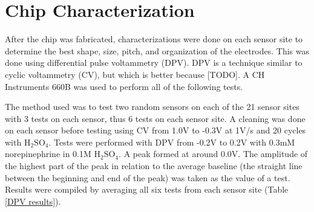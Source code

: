 \chapter{Chip Characterization}

After the chip was fabricated, characterizations were done on each sensor site to determine the best shape, size, pitch, and organization of the electrodes. This was done using differential pulse voltammetry (DPV). DPV is a technique similar to cyclic voltammetry (CV), but which is better because [TODO]. A CH Instruments 660B was used to perform all of the following tests.

The method used was to test two random sensors on each of the 21 sensor sites with 3 tests on each sensor, thus 6 tests on each sensor site. A cleaning was done on each sensor before testing using CV from 1.0V to -0.3V at 1V/s and 20 cycles with $\mathrm{H_2SO_4}$. Tests were performed with DPV from -0.2V to 0.2V with 0.3mM norepinephrine in 0.1M $\mathrm{H_2SO_4}$. A peak formed at around 0.0V. The amplitude of the highest part of the peak in relation to the average baseline (the straight line between the beginning and end of the peak) was taken as the value of a test. Results were compiled by averaging all six tests from each sensor site (Table \ref{DPV results}).


